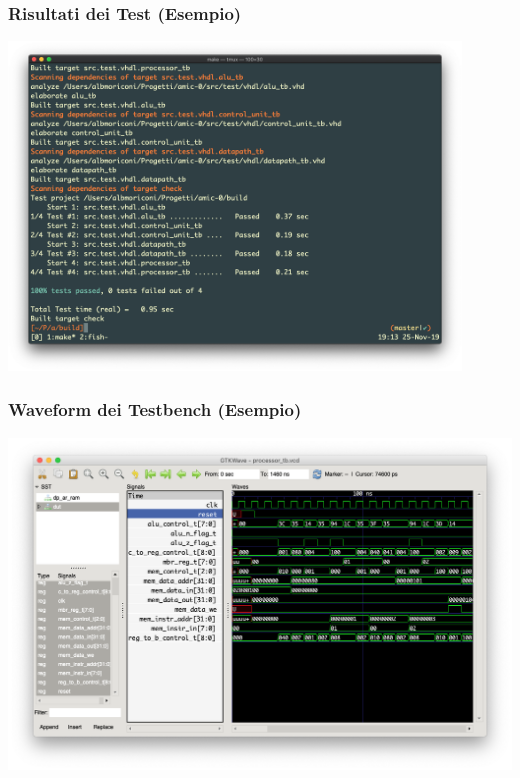 \documentclass{beamer}
\begin{document}
\begin{frame}
  \frametitle{Risultati dei Test (Esempio)}
  \begin{center}
    \includegraphics[width=0.9\textwidth]{test.png}
  \end{center}
\end{frame}

\begin{frame}
  \frametitle{Waveform dei Testbench (Esempio)}
  \begin{center}
    \includegraphics[width=\textwidth]{waveform.png}
  \end{center}
\end{frame}
\end{document}

